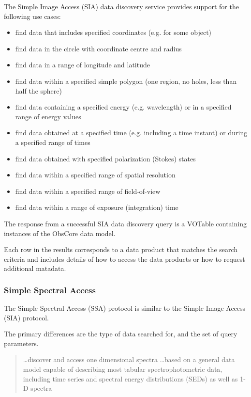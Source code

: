 \documentclass{article}
\begin{document}
{The Simple Image Access (SIA) data discovery service provides support for
the following use cases:

\begin{itemize}
  \item find data that includes specified coordinates (e.g. for some object) 
  \item find data in the circle with coordinate centre and radius 
  \item find data in a range of longitude and latitude 
  \item find data within a specified simple  polygon (one region, no holes, less
  than half the sphere)
  \item find data containing a specified energy (e.g. wavelength) or in a
  specified range of energy values
  \item find data obtained at a specified time (e.g. including a time instant)
  or during a specified range of times
  \item find data obtained with specified polarization (Stokes) states 
  \item find data within a specified range of spatial resolution 
  \item find data within a specified range of field-of-view 
  \item find data within a range of exposure (integration) time 
\end{itemize}

The response from a successful SIA data discovery query is a VOTable containing
instances of the ObsCore  data
model.

Each row in the results corresponds to a data product that matches the search
criteria and includes details of how to access the data products or how
to request additional matadata.

\subsubsection{Simple Spectral Access}

The Simple Spectral Access (SSA) protocol is similar to the Simple Image Access (SIA) protocol.

The primary differences are the type of data searched for, and the set of query
parameters.

\begin{quote}
\ldots discover and access one dimensional spectra
\ldots based on a general data model capable of describing most tabular
spectrophotometric data, including time series and spectral energy distributions
(SEDs) as well as 1-D spectra
\end{quote}

}
\end{document}
